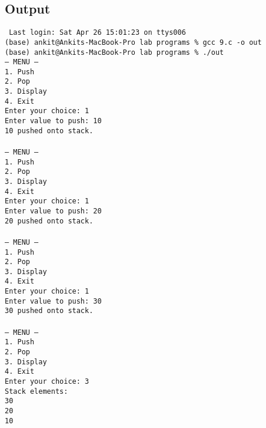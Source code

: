 \documentclass[12pt,a4paper]{article}
\begin{document}
\newpage

\subsection*{Output}
\begin{tcolorbox}[terminalstyle, title=Sample Output]
\texttt{
Last login: Sat Apr 26 15:01:23 on ttys006\\
(base) ankit@Ankits-MacBook-Pro lab programs \% gcc 9.c -o out\\
(base) ankit@Ankits-MacBook-Pro lab programs \% ./out\\
--- MENU ---\\
1. Push\\
2. Pop\\
3. Display\\
4. Exit\\
Enter your choice: 1\\
Enter value to push: 10\\
10 pushed onto stack.\\
\\
--- MENU ---\\
1. Push\\
2. Pop\\
3. Display\\
4. Exit\\
Enter your choice: 1\\
Enter value to push: 20\\
20 pushed onto stack.\\
\\
--- MENU ---\\
1. Push\\
2. Pop\\
3. Display\\
4. Exit\\
Enter your choice: 1\\
Enter value to push: 30\\
30 pushed onto stack.\\
\\
--- MENU ---\\
1. Push\\
2. Pop\\
3. Display\\
4. Exit\\
Enter your choice: 3\\
Stack elements:\\
30\\
20\\
10\\
}
\end{tcolorbox}
\end{document}
